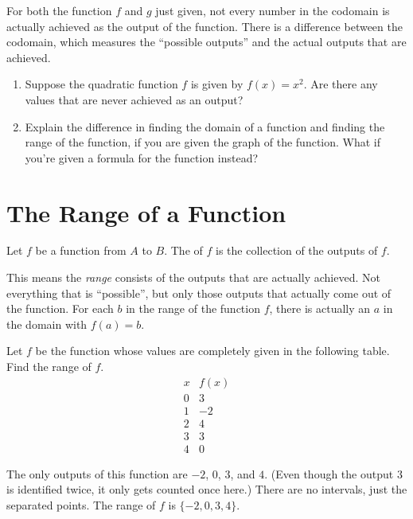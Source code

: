\documentclass[nooutcomes]{ximera}
\begin{document}
	For both the function $f$ and $g$ just given, not every number in the codomain is actually achieved as the output of the function. 
	There is a difference between the codomain, which measures the ``possible outputs'' and the actual outputs that are achieved.	
	
	
	\begin{exploration}
		\begin{enumerate}[label=\alph*.]
			\item Suppose the quadratic function $f$ is given by $f(x) = x^2$. Are there any values that are never achieved as an output?
			\item Explain the difference in finding the domain of a function and finding the range of the function, if you are given the graph of the function. What if you're given a formula for the function instead?
		\end{enumerate}
	\end{exploration}


\section{The Range of a Function}
	

	
	
	\begin{definition}
		Let $f$ be a function from $A$ to $B$. The  of $f$ is the collection of the outputs of $f$.
	\end{definition}
	This means the \emph{range} consists of the outputs that are actually achieved. Not everything that is ``possible'', but only those outputs that actually
	come out of the function. For each $b$ in the range of the function $f$, there is actually an $a$ in the domain with $f(a) = b$.

	\begin{example}
		Let $f$ be the function whose values are completely given in the following table. Find the range of $f$.
		$$ \begin{array}{c|c}
			  x & f(x)\\\hline
			  0 & 3\\
			  1 & -2\\
			  2 & 4\\
			  3 & 3\\
			  4 & 0
		\end{array}$$

		\begin{explanation}

			The only outputs of this function are $-2$, $0$, $3$, and $4$. 
			(Even though the output $3$ is identified twice, it only gets counted once here.) 
			There are no intervals, just the separated points. The range of $f$ is $\{ -2, 0, 3, 4 \}$.
		\end{explanation}	
	\end{example}
	
\end{document}
